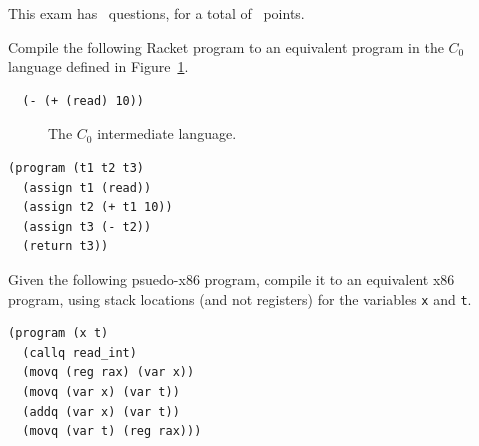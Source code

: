 \documentclass[12pt,answers]{exam}
\newcommand{\itm}[1]{\ensuremath{\mathit{#1}}}
\newcommand{\key}[1]{\texttt{#1}}
\begin{document}
\vspace{20pt}

\begin{center} 
This exam has \numquestions\ questions, for a total of \numpoints\ 
points. 
\end{center} 

\begin{questions}


\question[10] Compile the following Racket program to an equivalent
program in the $C_0$ language defined in Figure~\ref{fig:c0-syntax}.
\begin{lstlisting}
  (- (+ (read) 10))
\end{lstlisting}

\begin{figure}[h]
\centering
\fbox{
\begin{minipage}{0.65\textwidth}
\[
\begin{array}{lcl}
\itm{arg} &::=& \itm{int} \mid \itm{var} \\
\itm{exp} &::=& \itm{arg} \mid (\key{read}) \mid (\key{-}\;\itm{arg}) \mid (\key{+} \; \itm{arg}\;\itm{arg})\\
\itm{stmt} &::=& (\key{assign}~\itm{var}~\itm{exp}) \mid (\key{return}~\itm{arg}) \\
C_0 & ::= & (\key{program}\;(\itm{var}^{*})\;\itm{stmt}^{+})
\end{array}
\]
\end{minipage}
}
\caption{The $C_0$ intermediate language.}
\label{fig:c0-syntax}
\end{figure}


\begin{solution}[1in]
\begin{lstlisting}
(program (t1 t2 t3)
  (assign t1 (read))
  (assign t2 (+ t1 10))
  (assign t3 (- t2))
  (return t3))
\end{lstlisting}
\end{solution}

\question[10] Given the following psuedo-x86 program, compile it to an
equivalent x86 program, using stack locations (and not registers) for
the variables \texttt{x} and \texttt{t}.
\begin{lstlisting}
(program (x t)
  (callq read_int)
  (movq (reg rax) (var x))
  (movq (var x) (var t))
  (addq (var x) (var t))
  (movq (var t) (reg rax)))
\end{lstlisting}


\end{questions}
\end{document}
